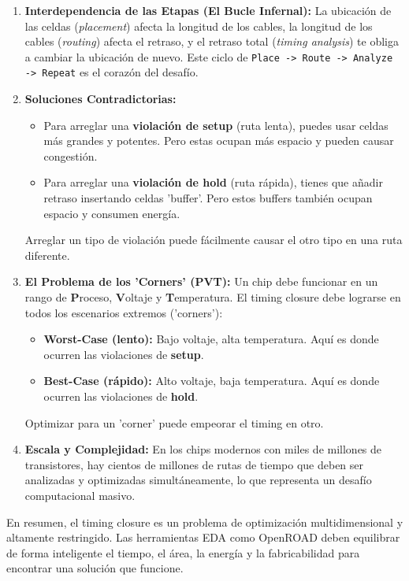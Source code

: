 \documentclass[12pt,a4paper]{article}
\begin{document}
\begin{enumerate}
    \item \textbf{Interdependencia de las Etapas (El Bucle Infernal):} La ubicación de las celdas (\textit{placement}) afecta la longitud de los cables, la longitud de los cables (\textit{routing}) afecta el retraso, y el retraso total (\textit{timing analysis}) te obliga a cambiar la ubicación de nuevo. Este ciclo de \texttt{Place -> Route -> Analyze -> Repeat} es el corazón del desafío.

    \item \textbf{Soluciones Contradictorias:}
    \begin{itemize}
        \item Para arreglar una \textbf{violación de setup} (ruta lenta), puedes usar celdas más grandes y potentes. Pero estas ocupan más espacio y pueden causar congestión.
        \item Para arreglar una \textbf{violación de hold} (ruta rápida), tienes que añadir retraso insertando celdas 'buffer'. Pero estos buffers también ocupan espacio y consumen energía.
    \end{itemize}
    Arreglar un tipo de violación puede fácilmente causar el otro tipo en una ruta diferente.

    \item \textbf{El Problema de los 'Corners' (PVT):} Un chip debe funcionar en un rango de \textbf{P}roceso, \textbf{V}oltaje y \textbf{T}emperatura. El timing closure debe lograrse en todos los escenarios extremos ('corners'):
    \begin{itemize}
        \item \textbf{Worst-Case (lento):} Bajo voltaje, alta temperatura. Aquí es donde ocurren las violaciones de \textbf{setup}.
        \item \textbf{Best-Case (rápido):} Alto voltaje, baja temperatura. Aquí es donde ocurren las violaciones de \textbf{hold}.
    \end{itemize}
    Optimizar para un 'corner' puede empeorar el timing en otro.

    \item \textbf{Escala y Complejidad:} En los chips modernos con miles de millones de transistores, hay cientos de millones de rutas de tiempo que deben ser analizadas y optimizadas simultáneamente, lo que representa un desafío computacional masivo.
\end{enumerate}

En resumen, el timing closure es un problema de optimización multidimensional y altamente restringido. Las herramientas EDA como OpenROAD deben equilibrar de forma inteligente el tiempo, el área, la energía y la fabricabilidad para encontrar una solución que funcione.
\end{document}
